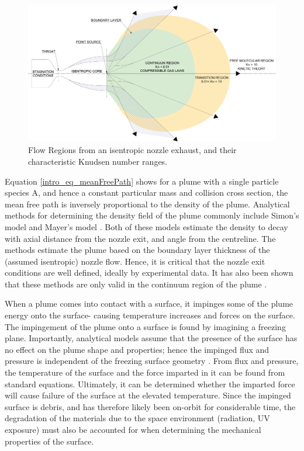 \documentclass[journal]{new-aiaa}
\begin{document}
\begin{figure}[ht]
  \centering
  \includegraphics[width=\columnwidth]{Figures/FlowRegions.pdf}
  \caption{Flow Regions from an isentropic nozzle exhaust, and their characteristic Knudsen number ranges.}
  \label{intro_fig_FlowRegions}
\end{figure}

Equation \ref{intro_eq_meanFreePath} shows for a plume with a single particle species A, and hence a constant particular mass and collision cross section, the mean free path is inversely proportional to the density of the plume. Analytical methods for determining the density field of the plume commonly include Simon's model and Mayer's model \cite{simonsEffectNozzleBoundary1972} \cite{mayerThrustLossDue1986}. Both of these models estimate the density to decay with axial distance from the nozzle exit, and angle from the centreline. The methods estimate the plume based on the boundary layer thickness of the (assumed isentropic) nozzle flow. Hence, it is critical that the nozzle exit conditions are well defined, ideally by experimental data. It has also been shown that these methods are only valid in the continuum region of the plume \cite{boydModelingSmallHydrazine1990}.

When a plume comes into contact with a surface, it impinges some of the plume energy onto the surface- causing temperature increases and forces on the surface. The impingement of the plume onto a surface is found by imagining a freezing plane. Importantly, analytical models assume that the presence of the surface has no effect on the plume shape and properties; hence the impinged flux and pressure is independent of the freezing surface geometry \cite{herraiz2019development}. From flux and pressure, the temperature of the surface and the force imparted in it can be found from standard equations. Ultimately, it can be determined whether the imparted force will cause failure of the surface at the elevated temperature. Since the impinged surface is debris, and has therefore likely been on-orbit for considerable time, the degradation of the materials due to the space environment (radiation, UV exposure) must also be accounted for when determining the mechanical properties of the surface.
\end{document}
